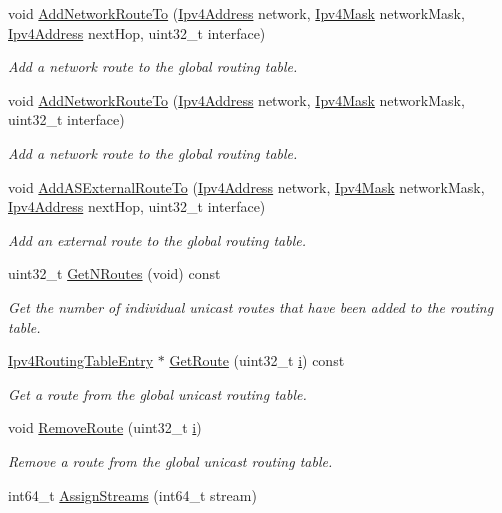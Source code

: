 \begin{DoxyCompactItemize}
void \hyperlink{classns3_1_1Ipv4GlobalRouting_aa4a606c4c390acd2127c216a9b1d24d4}{Add\+Network\+Route\+To} (\hyperlink{classns3_1_1Ipv4Address}{Ipv4\+Address} network, \hyperlink{classns3_1_1Ipv4Mask}{Ipv4\+Mask} network\+Mask, \hyperlink{classns3_1_1Ipv4Address}{Ipv4\+Address} next\+Hop, uint32\+\_\+t interface)
\begin{DoxyCompactList}\small\item\em Add a network route to the global routing table. \end{DoxyCompactList}\item 
void \hyperlink{classns3_1_1Ipv4GlobalRouting_af399f1eef7e7e3dcca122cb8cade0574}{Add\+Network\+Route\+To} (\hyperlink{classns3_1_1Ipv4Address}{Ipv4\+Address} network, \hyperlink{classns3_1_1Ipv4Mask}{Ipv4\+Mask} network\+Mask, uint32\+\_\+t interface)
\begin{DoxyCompactList}\small\item\em Add a network route to the global routing table. \end{DoxyCompactList}\item 
void \hyperlink{classns3_1_1Ipv4GlobalRouting_a1707024a710d982149a18db9725a771d}{Add\+A\+S\+External\+Route\+To} (\hyperlink{classns3_1_1Ipv4Address}{Ipv4\+Address} network, \hyperlink{classns3_1_1Ipv4Mask}{Ipv4\+Mask} network\+Mask, \hyperlink{classns3_1_1Ipv4Address}{Ipv4\+Address} next\+Hop, uint32\+\_\+t interface)
\begin{DoxyCompactList}\small\item\em Add an external route to the global routing table. \end{DoxyCompactList}\item 
uint32\+\_\+t \hyperlink{classns3_1_1Ipv4GlobalRouting_abb9d2b3642272b9bd2697a5699922fa7}{Get\+N\+Routes} (void) const 
\begin{DoxyCompactList}\small\item\em Get the number of individual unicast routes that have been added to the routing table. \end{DoxyCompactList}\item 
\hyperlink{classns3_1_1Ipv4RoutingTableEntry}{Ipv4\+Routing\+Table\+Entry} $\ast$ \hyperlink{classns3_1_1Ipv4GlobalRouting_accd518b9888908dbea189c1d1c73dcf1}{Get\+Route} (uint32\+\_\+t \hyperlink{lte__uplink__power__control_8m_a6f6ccfcf58b31cb6412107d9d5281426}{i}) const 
\begin{DoxyCompactList}\small\item\em Get a route from the global unicast routing table. \end{DoxyCompactList}\item 
void \hyperlink{classns3_1_1Ipv4GlobalRouting_a406d6a56f246ef9c105a6ad5da4d7ffb}{Remove\+Route} (uint32\+\_\+t \hyperlink{lte__uplink__power__control_8m_a6f6ccfcf58b31cb6412107d9d5281426}{i})
\begin{DoxyCompactList}\small\item\em Remove a route from the global unicast routing table. \end{DoxyCompactList}\item 
int64\+\_\+t \hyperlink{classns3_1_1Ipv4GlobalRouting_a392bf55dd79428567bd027c64af0c8be}{Assign\+Streams} (int64\+\_\+t stream)
\end{DoxyCompactItemize}
